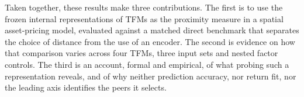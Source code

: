 Taken together, these results make three contributions. The first is to
use the frozen internal representations of TFMs as the proximity measure in
a spatial asset-pricing model, evaluated against a matched direct
benchmark that separates the choice of distance from the use of an
encoder. The second is evidence on how that comparison varies across four
TFMs, three input sets and nested factor controls. The third is an
account, formal and empirical, of what probing such a representation
reveals, and of why neither prediction accuracy, nor return fit, nor the
leading axis identifies the peers it selects.
